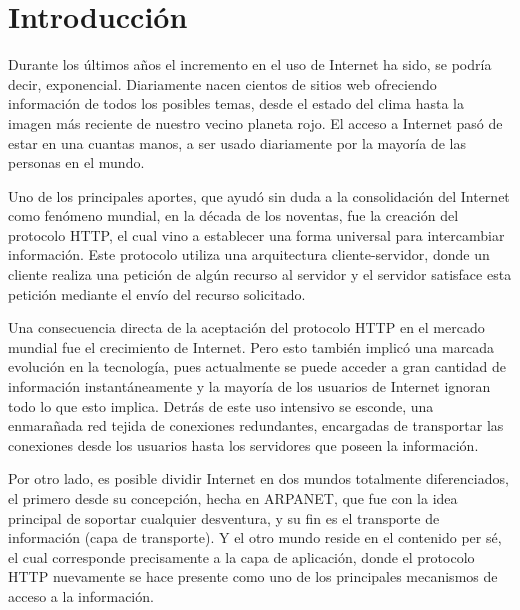 
\chapter{Introducción} %

\label{ch:introduction} %

Durante los últimos años el incremento en el uso de Internet ha sido, se podría decir, exponencial. Diariamente nacen cientos de sitios web ofreciendo información de todos los posibles temas, desde el estado del clima hasta la imagen más reciente de nuestro vecino planeta rojo. El acceso a Internet pasó de estar en una cuantas manos, a ser usado diariamente por la mayoría de las personas en el mundo.

Uno de los principales aportes, que ayudó sin duda a la consolidación del Internet como fenómeno mundial, en la década de los noventas, fue la creación del protocolo HTTP, el cual vino a establecer una forma universal para intercambiar información. Este protocolo utiliza una arquitectura cliente-servidor, donde un cliente realiza una petición de algún recurso al servidor y el servidor satisface esta petición mediante el envío del recurso solicitado. 

Una consecuencia directa de la aceptación del protocolo HTTP en el mercado mundial fue el crecimiento de Internet. Pero esto también implicó una marcada evolución en la tecnología, pues actualmente se puede acceder a gran cantidad de información instantáneamente y la mayoría de los usuarios de Internet ignoran todo lo que esto implica. Detrás de este uso intensivo se esconde, una enmarañada red tejida de conexiones redundantes, encargadas de transportar las conexiones desde los usuarios hasta los servidores que poseen la información. 

Por otro lado, es posible dividir Internet en dos mundos totalmente diferenciados, el primero desde su concepción, hecha en ARPANET, que fue con la idea principal de soportar cualquier desventura, y su fin es el transporte de información (capa de transporte). Y el otro mundo reside en el contenido per sé, el cual corresponde precisamente a la capa de aplicación, donde el protocolo HTTP nuevamente se hace presente como uno de los principales mecanismos de acceso a la información.


